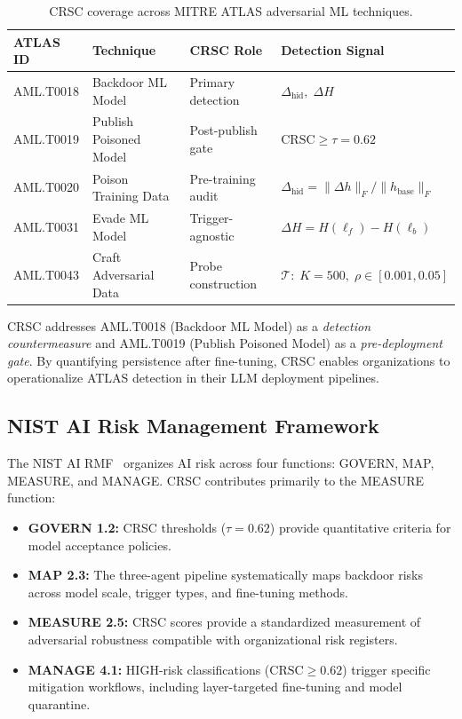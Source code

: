 \begin{table}[t]
\centering
\caption{CRSC coverage across MITRE ATLAS adversarial ML techniques.}
\label{tab:atlas}
\begin{tabularx}{\columnwidth}{@{} p{1.5cm} p{2.1cm} p{2.0cm} X @{}}
\toprule
\textbf{ATLAS ID} & \textbf{Technique} & \textbf{CRSC Role} & \textbf{Detection Signal} \\
\midrule
AML.T0018 & Backdoor ML Model      & Primary detection  & {\scriptsize$\Delta_{\text{hid}},\;\Delta H$} \\
AML.T0019 & Publish Poisoned Model & Post-publish gate  & {\scriptsize$\text{CRSC} \geq \tau = 0.62$} \\
AML.T0020 & Poison Training Data   & Pre-training audit & {\scriptsize$\Delta_{\text{hid}} = \|\Delta h\|_F / \|h_{\text{base}}\|_F$} \\
AML.T0031 & Evade ML Model         & Trigger-agnostic   & {\scriptsize$\Delta H = H(\ell_f) - H(\ell_b)$} \\
AML.T0043 & Craft Adversarial Data & Probe construction & {\scriptsize$\mathcal{T}{:}\;K\!=\!500,\;\rho\!\in\![0.001, 0.05]$} \\
\bottomrule
\end{tabularx}
\end{table}

CRSC addresses AML.T0018 (Backdoor ML Model) as a \emph{detection countermeasure}
and AML.T0019 (Publish Poisoned Model) as a \emph{pre-deployment gate}. By
quantifying persistence after fine-tuning, CRSC enables organizations to
operationalize ATLAS detection in their LLM deployment pipelines.

\subsection{NIST AI Risk Management Framework}

The NIST AI RMF~\cite{nist_ai_rmf2023} organizes AI risk across four functions:
GOVERN, MAP, MEASURE, and MANAGE. CRSC contributes primarily to the MEASURE
function:

\begin{itemize}[leftmargin=*]
  \item \textbf{GOVERN 1.2:} CRSC thresholds ($\tau = 0.62$) provide
  quantitative criteria for model acceptance policies.

  \item \textbf{MAP 2.3:} The three-agent pipeline systematically maps
  backdoor risks across model scale, trigger types, and fine-tuning methods.

  \item \textbf{MEASURE 2.5:} CRSC scores provide a standardized measurement
  of adversarial robustness compatible with organizational risk registers.

  \item \textbf{MANAGE 4.1:} HIGH-risk classifications ($\text{CRSC} \geq 0.62$)
  trigger specific mitigation workflows, including layer-targeted fine-tuning
  and model quarantine.
\end{itemize}

